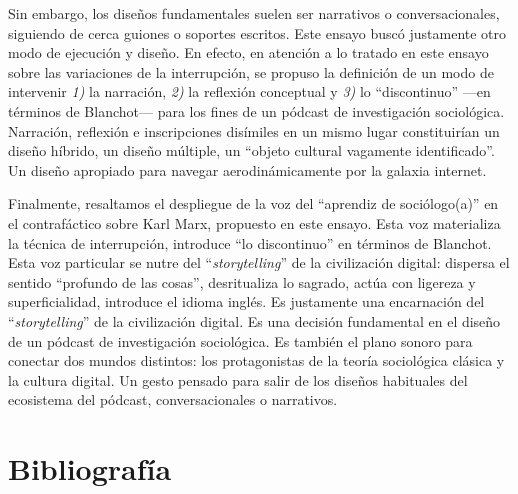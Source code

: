 \documentclass[
]{interact}
\begin{document}
Sin embargo, los diseños fundamentales suelen ser narrativos o
conversacionales, siguiendo de cerca guiones o soportes escritos. Este
ensayo buscó justamente otro modo de ejecución y diseño. En efecto, en
atención a lo tratado en este ensayo sobre las variaciones de la
interrupción, se propuso la definición de un modo de intervenir
\emph{1)} la narración, \emph{2)} la reflexión conceptual y \emph{3)} lo
``discontinuo'' ---en términos de Blanchot--- para los fines de un
pódcast de investigación sociológica. Narración, reflexión e
inscripciones disímiles en un mismo lugar constituirían un diseño
híbrido, un diseño múltiple, un ``objeto cultural vagamente
identificado''. Un diseño apropiado para navegar aerodinámicamente por
la galaxia internet.

Finalmente, resaltamos el despliegue de la voz del ``aprendiz de
sociólogo(a)'' en el contrafáctico sobre Karl Marx, propuesto en este
ensayo. Esta voz materializa la técnica de interrupción, introduce ``lo
discontinuo'' en términos de Blanchot. Esta voz particular se nutre del
``\emph{storytelling}'' de la civilización digital: dispersa el sentido
``profundo de las cosas'', desritualiza lo sagrado, actúa con ligereza y
superficialidad, introduce el idioma inglés. Es justamente una
encarnación del ``\emph{storytelling}'' de la civilización digital. Es
una decisión fundamental en el diseño de un pódcast de investigación
sociológica. Es también el plano sonoro para conectar dos mundos
distintos: los protagonistas de la teoría sociológica clásica y la
cultura digital. Un gesto pensado para salir de los diseños habituales
del ecosistema del pódcast, conversacionales o narrativos.

\section*{Bibliografía}\label{bibliografuxeda}
\end{document}
